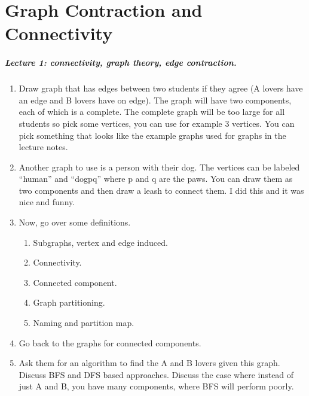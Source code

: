 \chapter{Graph Contraction and Connectivity}
\label{ch:graph-contraction}
\label{ch:gc}
{
\begin{notesonly}
\paragraph{Lecture 1: connectivity, graph theory, edge contraction.} 
\begin{enumerate}

\item
Draw graph that has edges between two
students if they agree (A lovers have an edge and B lovers have on
edge).  The graph will have two components, each of which is a
complete.  The complete graph will be too large for all students so
pick some vertices, you can use for example 3 vertices. You can pick
something that looks like the example graphs used for graphs in the
lecture notes.

\item Another graph to use is a person with their dog.  The vertices
  can be labeled ``human'' and ``dogpq'' where p and q are the paws.
  You can draw them as two  components and then draw a leash to
  connect them.  I did this and it was nice and funny.

\item Now, go over some definitions.
\begin{enumerate}

\item Subgraphs, vertex and edge induced.

\item Connectivity. 

\item Connected component.

\item Graph partitioning. 

\item Naming and partition map.
\end{enumerate}

\item Go back to the graphs for connected components.

\item Ask them for an algorithm to find the A and B lovers given
  this graph.  Discuss BFS and DFS based approaches.  Discuss the case
  where instead of just A and B, you have many components, where BFS
  will perform poorly.




\end{enumerate}
\end{notesonly}}
